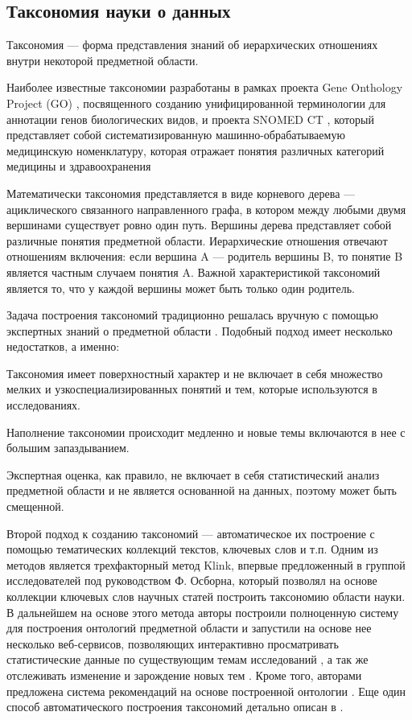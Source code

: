 \documentclass[12pt]{article}
\newenvironment{itemize*}%
{\begin{itemize}%
	\setlength{\itemsep}{0pt}%
	\setlength{\parskip}{0pt}}%
{\end{itemize}}
\let\oldsubsection\subsection
\renewcommand{\subsection}{\clearpage\oldsubsection}
\begin{document}
\subsection{Таксономия науки о данных}

Таксономия --- форма представления знаний об иерархических отношениях внутри некоторой предметной области.

Наиболее известные таксономии разработаны в рамках проекта Gene Onthology Project (GO) \cite{gene2018gene}, посвященного созданию унифицированной терминологии для аннотации генов биологических видов, и проекта SNOMED CT \cite{lee2013survey}, который представляет собой систематизированную машинно-обрабатываемую медицинскую номенклатуру, которая отражает понятия различных категорий медицины и здравоохранения

Математически таксономия представляется в виде корневого дерева --- ациклического связанного направленного графа, в котором между любыми двумя вершинами существует ровно один путь. Вершины дерева представляет собой различные понятия предметной области. Иерархические отношения отвечают отношениям включения: если вершина A --- родитель вершины B, то понятие B является частным случаем понятия A. Важной характеристикой таксономий является то, что у каждой вершины может быть только один родитель. 

Задача построения таксономий традиционно решалась вручную с помощью экспертных знаний о предметной области \cite{usman2017taxonomies}. Подобный подход имеет несколько недостатков, а именно:
\begin{itemize*}
	\item Таксономия имеет поверхностный характер и не включает в себя множество мелких и узкоспециализированных понятий и тем, которые используются в исследованиях.
	\item Наполнение таксономии происходит медленно и новые темы включаются в нее с большим запаздыванием.
	\item Экспертная оценка, как правило, не включает в себя статистический анализ предметной области и не является основанной на данных, поэтому может быть смещенной.
\end{itemize*}

Второй подход к созданию таксономий --- автоматическое их построение с помощью тематических коллекций текстов, ключевых слов и т.п. Одним из методов является трехфакторный метод Klink, впервые предложенный в \cite{Osborne2012} группой исследователей под руководством Ф. Осборна, который позволял на основе коллекции ключевых слов научных статей построить таксономию области науки. В дальнейшем на основе этого метода авторы построили полноценную систему для построения онтологий предметной области \cite{Osborne2015} и запустили на основе нее несколько веб-сервисов, позволяющих интерактивно просматривать статистические данные по существующим темам исследований \cite{Salatino2018}, а так же отслеживать изменение и зарождение новых тем \cite{Osborne2013}. Кроме того, авторами предложена система рекомендаций на основе построенной онтологии \cite{Thanapalasingam2018}. Еще один способ автоматического построения таксономий детально описан в \cite{usman2017taxonomies}.
\end{document}
